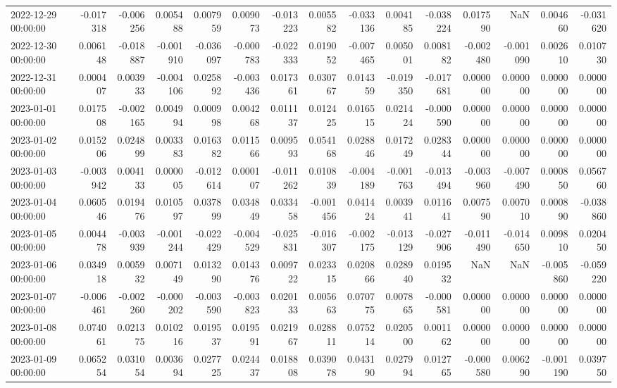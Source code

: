 \begin{tabular}{lrrrrrrrrrrrrrr}
2022-12-29 00:00:00 & -0.017318 & -0.006256 & 0.005488 & 0.007959 & 0.009073 & -0.013223 & 0.005582 & -0.033136 & 0.004185 & -0.038224 & 0.017590 & NaN & 0.004660 & -0.031620 \\
2022-12-30 00:00:00 & 0.006148 & -0.018887 & -0.001910 & -0.036097 & -0.000783 & -0.022333 & 0.019052 & -0.007465 & 0.005001 & 0.008182 & -0.002480 & -0.001090 & 0.002610 & 0.010730 \\
2022-12-31 00:00:00 & 0.000407 & 0.003933 & -0.004106 & 0.025892 & -0.003436 & 0.017361 & 0.030767 & 0.014359 & -0.019350 & -0.017681 & 0.000000 & 0.000000 & 0.000000 & 0.000000 \\
2023-01-01 00:00:00 & 0.017508 & -0.002165 & 0.004994 & 0.000998 & 0.004268 & 0.011137 & 0.012425 & 0.016515 & 0.021424 & -0.000590 & 0.000000 & 0.000000 & 0.000000 & 0.000000 \\
2023-01-02 00:00:00 & 0.015206 & 0.024899 & 0.003383 & 0.016382 & 0.011566 & 0.009593 & 0.054168 & 0.028846 & 0.017249 & 0.028344 & 0.000000 & 0.000000 & 0.000000 & 0.000000 \\
2023-01-03 00:00:00 & -0.003942 & 0.004133 & 0.000005 & -0.012614 & 0.000107 & -0.011262 & 0.010839 & -0.004189 & -0.001763 & -0.013494 & -0.003960 & -0.007490 & 0.000850 & 0.056760 \\
2023-01-04 00:00:00 & 0.060546 & 0.019476 & 0.010597 & 0.037899 & 0.034849 & 0.033458 & -0.001456 & 0.041424 & 0.003941 & 0.011641 & 0.007590 & 0.007010 & 0.000890 & -0.038860 \\
2023-01-05 00:00:00 & 0.004478 & -0.003939 & -0.001244 & -0.022429 & -0.004529 & -0.025831 & -0.016307 & -0.002175 & -0.013129 & -0.027906 & -0.011490 & -0.014650 & 0.009810 & 0.020450 \\
2023-01-06 00:00:00 & 0.034918 & 0.005932 & 0.007149 & 0.013290 & 0.014376 & 0.009722 & 0.023315 & 0.020866 & 0.028940 & 0.019532 & NaN & NaN & -0.005860 & -0.059220 \\
2023-01-07 00:00:00 & -0.006461 & -0.002260 & -0.000202 & -0.003590 & -0.003823 & 0.020133 & 0.005663 & 0.070775 & 0.007865 & -0.000581 & 0.000000 & 0.000000 & 0.000000 & 0.000000 \\
2023-01-08 00:00:00 & 0.074061 & 0.021375 & 0.010216 & 0.019537 & 0.019591 & 0.021967 & 0.028811 & 0.075214 & 0.020500 & 0.001162 & 0.000000 & 0.000000 & 0.000000 & 0.000000 \\
2023-01-09 00:00:00 & 0.065254 & 0.031054 & 0.003694 & 0.027725 & 0.024437 & 0.018808 & 0.039078 & 0.043190 & 0.027994 & 0.012765 & -0.000580 & 0.006290 & -0.001190 & 0.039750 \\

\end{tabular}
